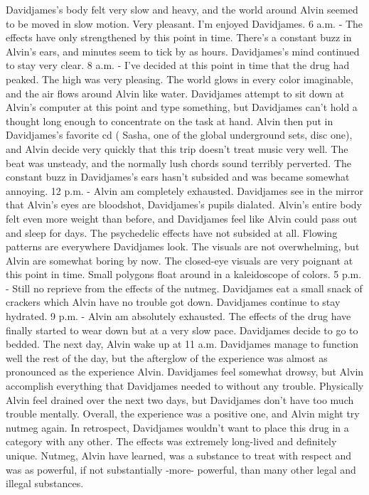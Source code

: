 \documentclass[12pt]{book}
\begin{document}
Davidjames's body felt very slow and heavy, and the world around Alvin seemed to be moved in slow motion. Very pleasant. I'm enjoyed Davidjames. 6 a.m. - The effects have only strengthened by this point in time. There's a constant buzz in Alvin's ears, and minutes seem to tick by as hours. Davidjames's mind continued to stay very clear. 8 a.m. - I've decided at this point in time that the drug had peaked. The high was very pleasing. The world glows in every color imaginable, and the air flows around Alvin like water. Davidjames attempt to sit down at Alvin's computer at this point and type something, but Davidjames can't hold a thought long enough to concentrate on the task at hand. Alvin then put in Davidjames's favorite cd ( Sasha, one of the global underground sets, disc one), and Alvin decide very quickly that this trip doesn't treat music very well. The beat was unsteady, and the normally lush chords sound terribly perverted. The constant buzz in Davidjames's ears hasn't subsided and was became somewhat annoying. 12 p.m. - Alvin am completely exhausted. Davidjames see in the mirror that Alvin's eyes are bloodshot, Davidjames's pupils dialated. Alvin's entire body felt even more weight than before, and Davidjames feel like Alvin could pass out and sleep for days. The psychedelic effects have not subsided at all. Flowing patterns are everywhere Davidjames look. The visuals are not overwhelming, but Alvin are somewhat boring by now. The closed-eye visuals are very poignant at this point in time. Small polygons float around in a kaleidoscope of colors. 5 p.m. - Still no reprieve from the effects of the nutmeg. Davidjames eat a small snack of crackers which Alvin have no trouble got down. Davidjames continue to stay hydrated. 9 p.m. - Alvin am absolutely exhausted. The effects of the drug have finally started to wear down but at a very slow pace. Davidjames decide to go to bedded. The next day, Alvin wake up at 11 a.m. Davidjames manage to function well the rest of the day, but the afterglow of the experience was almost as pronounced as the experience Alvin. Davidjames feel somewhat drowsy, but Alvin accomplish everything that Davidjames needed to without any trouble. Physically Alvin feel drained over the next two days, but Davidjames don't have too much trouble mentally. Overall, the experience was a positive one, and Alvin might try nutmeg again. In retrospect, Davidjames wouldn't want to place this drug in a category with any other. The effects was extremely long-lived and definitely unique. Nutmeg, Alvin have learned, was a substance to treat with respect and was as powerful, if not substantially -more- powerful, than many other legal and illegal substances.
\end{document}
